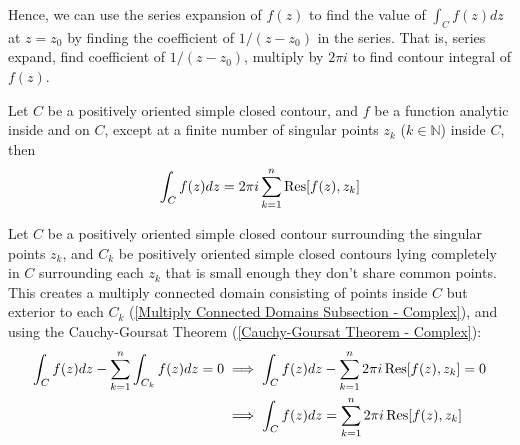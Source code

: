 \documentclass[12pt, english]{book}
\makeatletter
\renewenvironment{proof}[1][\proofname]{\par
	\pushQED{\qed}%
	\normalfont \topsep6\p@\@plus6\p@\relax
	\list{}{%
		\settowidth{\leftmargin}{\itshape\proofname:\hskip\labelsep}%
		\setlength{\labelwidth}{0pt}%
		\setlength{\itemindent}{-\leftmargin}%
	}%
	\item[\hskip\labelsep\itshape#1\@addpunct{:}]\ignorespaces
}{%
	\popQED\endlist\@endpefalse
}
\makeatother
\begin{document}
	Hence, we can use the series expansion of \(f(z)\) to find the value of \(\int_{C} f(z) dz\) at \(z=z_0\) by finding the coefficient of \(1/(z-z_0)\) in the series. That is, series expand, find coefficient of \(1/(z-z_0)\), multiply by \(2\pi i\) to find contour integral of \(f(z)\).
	
	\begin{figure}[H]
		\centering
	\end{figure}
	
	\begin{theorem}
		\label{Cauchy's Residue Theorem - Complex}
		Let \(C\) be a positively oriented simple closed contour, and \(f\) be a function analytic inside and on \(C\), except at a finite number of singular points \(z_k\) (\(k \in \mathbb{N}\)) inside \(C\), then 
		\begin{align*}
			\int_{C} f(z) dz = 2\pi i \sum_{k=1}^{n} \Res[f(z), z_k] 
		\end{align*}
	\end{theorem}
	\begin{proof}
		Let \(C\) be a positively oriented simple closed contour surrounding the singular points \(z_k\), and \(C_k\) be positively oriented simple closed contours lying completely in \(C\) surrounding each \(z_k\) that is small enough they don't share common points. 
		This creates a multiply connected domain consisting of points inside \(C\) but exterior to each \(C_k\) (\cref{Multiply Connected Domains Subsection - Complex}), and using the Cauchy-Goursat Theorem (\cref{Cauchy-Goursat Theorem - Complex}):
		\begin{align*}
			\int_{C} f(z) dz - \sum_{k=1}^{n} \int_{C_k} f(z) dz = 0
			&\implies \int_{C} f(z) dz - \sum_{k=1}^{n} 2\pi i \Res[f(z), z_k]= 0 \\
			&\implies \int_{C} f(z) dz = \sum_{k=1}^{n} 2\pi i \Res[f(z), z_k]
		\end{align*}
	\end{proof}
\end{document}
